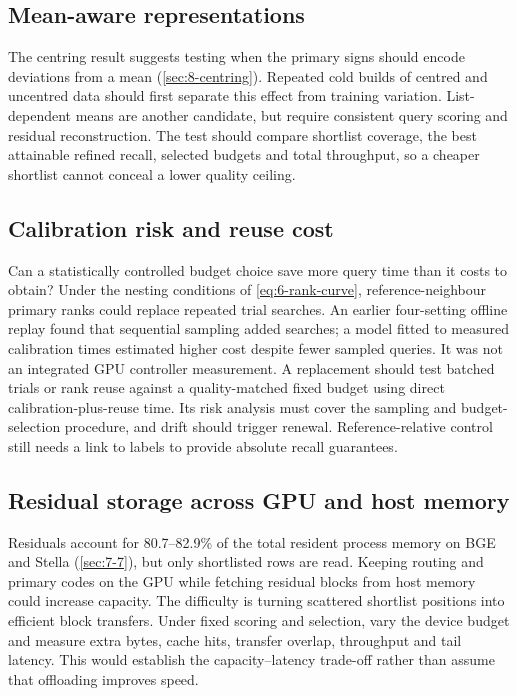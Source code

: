 \subsection{Mean-aware representations}

The centring result suggests testing when the primary signs should
encode deviations from a mean (\cref{sec:8-centring}). Repeated cold
builds of centred and uncentred data should first separate this effect
from training variation. List-dependent means are another candidate,
but require consistent query scoring and residual reconstruction.
The test should compare shortlist coverage, the best attainable refined
recall, selected budgets and total throughput, so a cheaper shortlist
cannot conceal a lower quality ceiling.

\subsection{Calibration risk and reuse cost}

Can a statistically controlled budget choice save more query time than
it costs to obtain? Under the nesting conditions of
\cref{eq:6-rank-curve}, reference-neighbour primary ranks could replace
repeated trial searches. An earlier four-setting offline replay found
that sequential sampling added searches; a model fitted to measured
calibration times estimated higher cost despite fewer sampled queries.
It was not an integrated GPU controller measurement. A replacement
should test batched trials or rank reuse against a quality-matched fixed
budget using direct calibration-plus-reuse time. Its risk analysis must
cover the sampling and budget-selection procedure, and drift should
trigger renewal. Reference-relative control still needs a link to labels
to provide absolute recall guarantees.

\subsection{Residual storage across GPU and host memory}

Residuals account for 80.7--82.9\% of the total resident process memory
on BGE and Stella (\cref{sec:7-7}), but only shortlisted rows are read.
Keeping routing and primary codes on the GPU while fetching residual
blocks from host memory could increase capacity. The difficulty is
turning scattered shortlist positions into efficient block transfers.
Under fixed scoring and selection, vary the device budget and measure
extra bytes, cache hits, transfer overlap, throughput and tail latency.
This would establish the capacity--latency trade-off rather than assume
that offloading improves speed.

